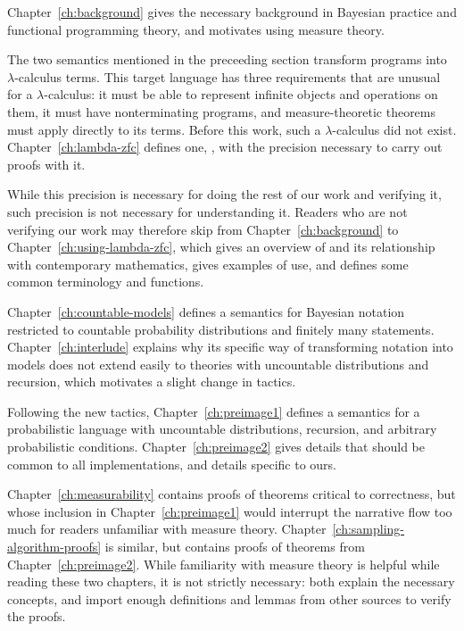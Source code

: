 Chapter~\ref{ch:background} gives the necessary background in Bayesian practice and functional programming theory, and motivates using measure theory.

The two semantics mentioned in the preceeding section transform programs into $\lambda$-calculus terms.
This target language has three requirements that are unusual for a $\lambda$-calculus: it must be able to represent infinite objects and operations on them, it must have nonterminating programs, and measure-theoretic theorems must apply directly to its terms.
Before this work, such a $\lambda$-calculus did not exist.
Chapter~\ref{ch:lambda-zfc} defines one, \lzfclang, with the precision necessary to carry out proofs with it.

While this precision is necessary for doing the rest of our work and verifying it, such precision is not necessary for understanding it.
Readers who are not verifying our work may therefore skip from Chapter~\ref{ch:background} to Chapter~\ref{ch:using-lambda-zfc}, which gives an overview of \lzfclang and its relationship with contemporary mathematics, gives examples of use, and defines some common terminology and functions.

Chapter~\ref{ch:countable-models} defines a semantics for Bayesian notation restricted to countable probability distributions and finitely many statements.
Chapter~\ref{ch:interlude} explains why its specific way of transforming notation into models does not extend easily to theories with uncountable distributions and recursion, which motivates a slight change in tactics.

Following the new tactics, Chapter~\ref{ch:preimage1} defines a semantics for a probabilistic language with uncountable distributions, recursion, and arbitrary probabilistic conditions.
Chapter~\ref{ch:preimage2} gives details that should be common to all implementations, and details specific to ours.

Chapter~\ref{ch:measurability} contains proofs of theorems critical to correctness, but whose inclusion in Chapter~\ref{ch:preimage1} would interrupt the narrative flow too much for readers unfamiliar with measure theory.
Chapter~\ref{ch:sampling-algorithm-proofs} is similar, but contains proofs of theorems from Chapter~\ref{ch:preimage2}.
While familiarity with measure theory is helpful while reading these two chapters, it is not strictly necessary: both explain the necessary concepts, and import enough definitions and lemmas from other sources to verify the proofs.




